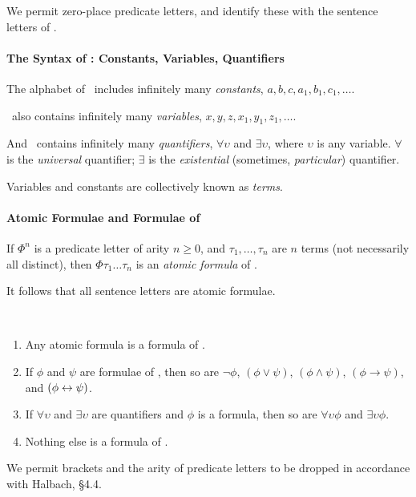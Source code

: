   We permit zero-place predicate letters, and identify these with the sentence letters of \lone. 

\paragraph{The Syntax of \ltwo: Constants, Variables, Quantifiers}

The alphabet of \ltwo\  includes infinitely many \emph{constants}, $a,b,c,a_{1},b_{1},c_{1},\ldots$.

\ltwo\ also contains infinitely many \emph{variables}, $x,y,z,x_{1},y_{1},z_{1},\ldots$.

And \ltwo\ contains infinitely many \emph{quantifiers}, $\forall \upsilon$ and $\exists \upsilon$, where $\upsilon$ is any variable. $\forall$ is the \emph{universal} quantifier; $\exists$ is the \emph{existential} (sometimes, \emph{particular}) quantifier.

  Variables and constants are collectively known as \emph{terms}.

\paragraph{Atomic Formulae and Formulae  of \ltwo}

\begin{definition}
	If $\Phi^{n}$ is a predicate letter of arity $n\geqslant 0$, and $\tau_{1},\ldots,\tau_{n}$ are $n$ terms (not necessarily all distinct), then $\Phi\tau_{1}\ldots\tau_{n}$ is an \emph{atomic formula} of \ltwo.
\end{definition} It follows that all sentence letters are atomic formulae.

\begin{definition}[Formula]~
	
	\begin{enumerate}
		\item Any atomic formula is a formula of \ltwo.
		\item If $\phi$ and $\psi$ are formulae of \ltwo, then so are $\neg\phi$, $(\phi\vee\psi)$, $(\phi\wedge\psi)$, $(\phi \to \psi)$, and $(\phi\leftrightarrow\psi)$.
		\item If $\forall\upsilon$ and $\exists\upsilon$ are quantifiers and $\phi$ is a formula, then so are $\forall\upsilon \phi$ and $\exists\upsilon \phi$.
		\item Nothing else is a formula of \ltwo.
	\end{enumerate}
\end{definition}We permit brackets and the arity of predicate letters to be dropped in accordance with Halbach, \S 4.4.

